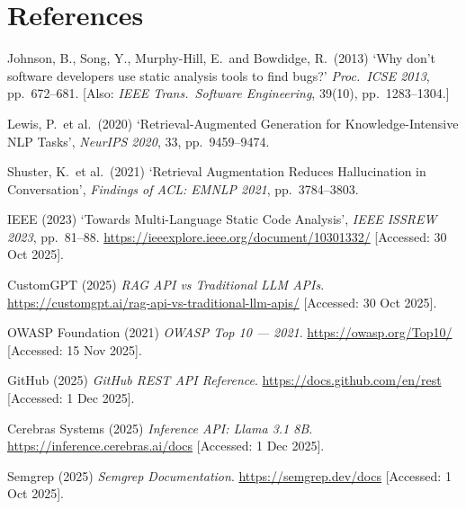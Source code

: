 \documentclass[12pt,a4paper]{article}
\begin{document}
\section{References}

\begin{enumerate}[leftmargin=1.5em,label={[\arabic*]}]
  \item Johnson, B., Song, Y., Murphy-Hill, E.\ and Bowdidge, R.\ (2013) `Why don't
  software developers use static analysis tools to find bugs?'
  \textit{Proc.\ ICSE 2013}, pp.\ 672--681. [Also: \textit{IEEE Trans.\ Software
  Engineering}, 39(10), pp.\ 1283--1304.]

  \item Lewis, P.\ et al.\ (2020) `Retrieval-Augmented Generation for
  Knowledge-Intensive NLP Tasks', \textit{NeurIPS 2020}, 33, pp.\ 9459--9474.

  \item Shuster, K.\ et al.\ (2021) `Retrieval Augmentation Reduces Hallucination
  in Conversation', \textit{Findings of ACL: EMNLP 2021}, pp.\ 3784--3803.

  \item IEEE (2023) `Towards Multi-Language Static Code Analysis',
  \textit{IEEE ISSREW 2023}, pp.\ 81--88.
  \url{https://ieeexplore.ieee.org/document/10301332/}
  [Accessed: 30 Oct 2025].

  \item CustomGPT (2025) \textit{RAG API vs Traditional LLM APIs}.
  \url{https://customgpt.ai/rag-api-vs-traditional-llm-apis/}
  [Accessed: 30 Oct 2025].

  \item OWASP Foundation (2021) \textit{OWASP Top 10 --- 2021}.
  \url{https://owasp.org/Top10/} [Accessed: 15 Nov 2025].

  \item GitHub (2025) \textit{GitHub REST API Reference}.
  \url{https://docs.github.com/en/rest} [Accessed: 1 Dec 2025].

  \item Cerebras Systems (2025) \textit{Inference API: Llama 3.1 8B}.
  \url{https://inference.cerebras.ai/docs} [Accessed: 1 Dec 2025].

  \item Semgrep (2025) \textit{Semgrep Documentation}.
  \url{https://semgrep.dev/docs} [Accessed: 1 Oct 2025].
\end{enumerate}
\end{document}
